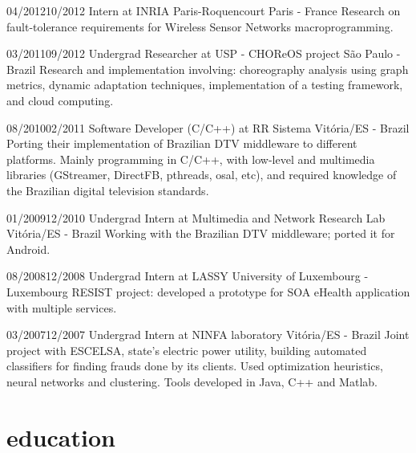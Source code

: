 \documentclass{nirev-cv}
\begin{document}
\begin{smallentrylist}

\shortworkentry
  {04/2012}{10/2012}
  {Intern at INRIA Paris-Roquencourt}
  {Paris - France}
  {Research on fault-tolerance requirements for Wireless Sensor Networks macroprogramming.}

\shortworkentry
  {03/2011}{09/2012}
  {Undergrad Researcher at USP - CHOReOS project}
  {São Paulo - Brazil}
  {Research and implementation involving: choreography analysis using graph metrics,
  dynamic adaptation techniques, implementation of a testing framework, and cloud computing.}

\shortworkentry
  {08/2010}{02/2011}
  {Software Developer (C/C++) at RR Sistema}
  {Vitória/ES - Brazil}
  {Porting their implementation of Brazilian DTV middleware to different platforms.
  Mainly programming in C/C++, with low-level and multimedia libraries (GStreamer, DirectFB, pthreads, osal, etc),
  and required knowledge of the Brazilian digital television standards.}

\shortworkentry
  {01/2009}{12/2010}
  {Undergrad Intern at Multimedia and Network Research Lab}
  {Vitória/ES - Brazil}
  {Working with the Brazilian DTV middleware; ported it for Android. }

\shortworkentry
  {08/2008}{12/2008}
  {Undergrad Intern at LASSY}
  {University of Luxembourg - Luxembourg}
  {RESIST project: developed a prototype for SOA eHealth application with multiple services.}


\shortworkentry
  {03/2007}{12/2007}
  {Undergrad Intern at NINFA laboratory}
  {Vitória/ES - Brazil}
  {Joint project with ESCELSA, state's electric power utility, building automated classifiers
  for finding frauds done by its clients. Used optimization heuristics, neural networks and clustering.
  Tools developed in Java, C++ and Matlab.}

\end{smallentrylist}


\section{education}
 
\end{document}
